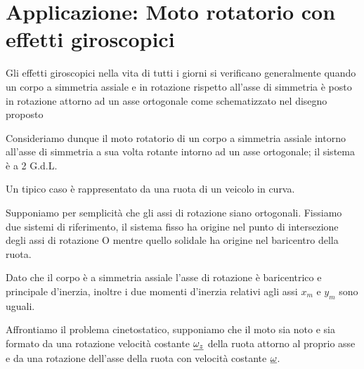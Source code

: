 \section{Applicazione: Moto rotatorio con effetti giroscopici}

	Gli effetti giroscopici nella vita di tutti i giorni si verificano generalmente quando un corpo a simmetria assiale e in rotazione rispetto all'asse di simmetria è posto in rotazione attorno ad un asse ortogonale come schematizzato nel disegno proposto
	
	Consideriamo dunque il moto rotatorio di un corpo a simmetria assiale intorno all'asse di simmetria a sua volta rotante intorno ad un asse ortogonale; il sistema è a 2 G.d.L.
	
	Un tipico caso è rappresentato da una ruota di un veicolo in curva.
	
	Supponiamo per semplicità che gli assi di rotazione siano ortogonali. Fissiamo due sistemi di riferimento, il sistema fisso ha origine nel punto di intersezione degli assi di rotazione O mentre quello solidale ha origine nel baricentro della ruota.
	
	Dato che il corpo è a simmetria assiale l'asse di rotazione è baricentrico e principale d'inerzia, inoltre i due momenti d'inerzia relativi agli assi $x_m$ e $y_m$ sono uguali.
	
	Affrontiamo il problema cinetostatico, supponiamo che il moto sia noto e sia formato da una rotazione velocità costante $\underline{\omega_z}$ della ruota attorno al proprio asse e da una rotazione dell'asse della ruota con velocità costante $\underline{\omega}$.
	
